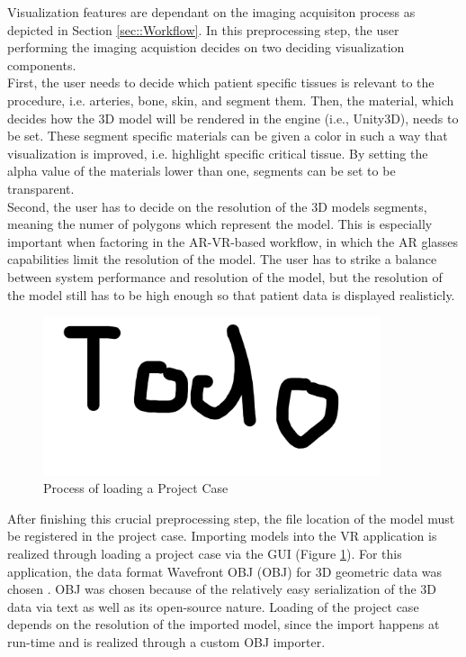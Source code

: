 Visualization features are dependant on the imaging acquisiton process as depicted in Section \ref{sec::Workflow}.
In this preprocessing step, the user performing the imaging acquistion decides on two deciding visualization components.
\\ First, the user needs to decide which patient specific tissues is relevant to the procedure, i.e. arteries, bone, skin, and segment them.
Then, the material, which decides how the 3D model will be rendered in the engine (i.e., Unity3D), needs to be set.
These segment specific materials can be given a color in such a way that visualization is improved, i.e. highlight specific critical tissue.
By setting the alpha value of the materials lower than one, segments can be set to be transparent.
\\ Second, the user has to decide on the resolution of the 3D models segments, meaning the numer of polygons which represent the model.
This is especially important when factoring in the AR-VR-based workflow, in which the AR glasses capabilities limit the resolution of the model.
The user has to strike a balance between system performance and resolution of the model, but the resolution of the model still has to be high enough so that patient data is displayed realisticly.

\begin{figure}[ht]
  \centering
  \includegraphics[width=375px]{images/todo.png}
  \caption{\label{fig::LoadingProjectCase}Process of loading a Project Case}
\end{figure}

After finishing this crucial preprocessing step, the file location of the model must be registered in the project case.
Importing models into the VR application is realized through loading a project case via the GUI (Figure \ref{fig::LoadingProjectCase}).
For this application, the data format Wavefront OBJ (OBJ) for 3D geometric data was chosen \cite{WavefrontOBJ}.
OBJ was chosen because of the relatively easy serialization of the 3D data via text as well as its open-source nature. 
Loading of the project case depends on the resolution of the imported model, since the import happens at run-time and is realized through a custom OBJ importer. 

